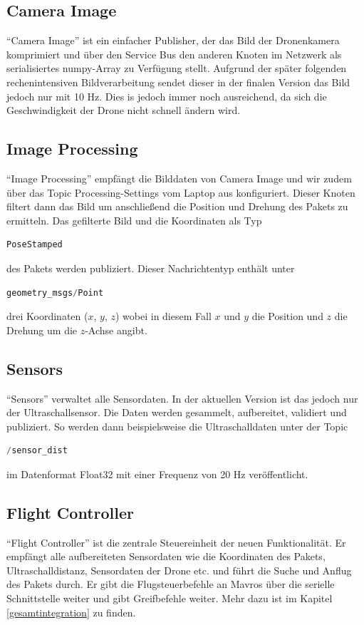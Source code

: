 \subsection{Camera Image} ``Camera Image'' ist ein einfacher Publisher, der das Bild der Dronenkamera komprimiert und über den Service Bus den anderen Knoten im Netzwerk als serialisiertes numpy-Array zu Verfügung stellt. Aufgrund der später folgenden rechenintensiven Bildverarbeitung sendet dieser in der finalen Version das Bild jedoch nur mit 10 Hz. Dies is jedoch immer noch ausreichend, da sich die Geschwindigkeit der Drone nicht schnell ändern wird. 
\subsection{Image Processing} ``Image Processing'' empfängt die Bilddaten von Camera Image und wir zudem über das Topic Processing-Settings vom Laptop aus konfiguriert. Dieser Knoten filtert dann das Bild um anschließend die Position und Drehung des Pakets zu ermitteln. Das gefilterte Bild und die Koordinaten als Typ
\begin{lstlisting}[language=Python]
PoseStamped
\end{lstlisting}
des Pakets werden publiziert. Dieser Nachrichtentyp enthält unter 
\begin{lstlisting}[language=Python]
geometry_msgs/Point
\end{lstlisting}
drei Koordinaten ($x$, $y$, $z$) wobei in diesem Fall $x$ und $y$ die Position und $z$ die Drehung um die $z$-Achse angibt.

\subsection{Sensors} ``Sensors'' verwaltet alle Sensordaten. In der aktuellen Version ist das jedoch nur der Ultraschallsensor. Die Daten werden gesammelt, aufbereitet, validiert und publiziert. So werden dann beispielsweise die Ultraschalldaten unter der Topic 
\begin{lstlisting}[language=Python]
/sensor_dist
\end{lstlisting}
im Datenformat Float32 mit einer Frequenz von 20 Hz veröffentlicht.

\subsection{Flight Controller} ``Flight Controller'' ist die zentrale Steuereinheit der neuen Funktionalität. Er empfängt alle aufbereiteten Sensordaten wie die Koordinaten des Pakets, Ultraschalldistanz, Sensordaten der Drone etc. und führt die Suche und Anflug des Pakets durch. Er gibt die Flugsteuerbefehle an Mavros über die serielle Schnittstelle weiter und gibt Greifbefehle weiter. Mehr dazu ist im Kapitel \ref{gesamtintegration} zu finden. 

